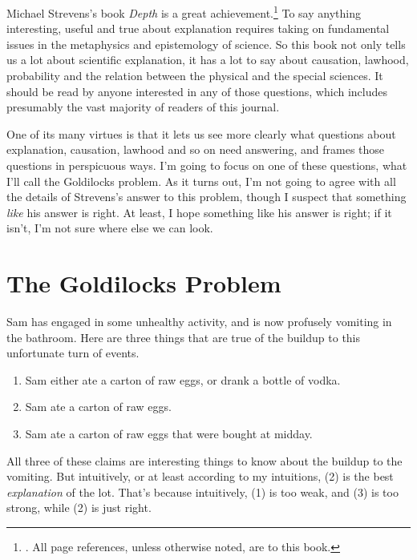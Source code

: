Michael Strevens's book \textit{Depth} is a great achievement.\footnote{\citet{Strevens2008}. All page references, unless otherwise noted, are to this book.} To say anything interesting, useful and true about explanation requires taking on fundamental issues in the metaphysics and epistemology of science. So this book not only tells us a lot about scientific explanation, it has a lot to say about causation, lawhood, probability and the relation between the physical and the special sciences. It should be read by anyone interested in any of those questions, which includes presumably the vast majority of readers of this journal.

One of its many virtues is that it lets us see more clearly what questions about explanation, causation, lawhood and so on need answering, and frames those questions in perspicuous ways. I'm going to focus on one of these questions, what I'll call the Goldilocks problem. As it turns out, I'm not going to agree with all the details of Strevens's answer to this problem, though I suspect that something \textit{like} his answer is right. At least, I hope something like his answer is right; if it isn't, I'm not sure where else we can look.


\section{The Goldilocks Problem}

Sam has engaged in some unhealthy activity, and is now profusely vomiting in the bathroom. Here are three things that are true of the buildup to this unfortunate turn of events.

\begin{enumerate}
\renewcommand{\labelenumi}{(\arabic{enumi})}
\item Sam either ate a carton of raw eggs, or drank a bottle of vodka.
\item Sam ate a carton of raw eggs.
\item Sam ate a carton of raw eggs that were bought at midday.
\end{enumerate}

\noindent All three of these claims are interesting things to know about the buildup to the vomiting. But intuitively, or at least according to my intuitions, (2) is the best \textit{explanation} of the lot. That's because intuitively, (1) is too weak, and (3) is too strong, while (2) is just right.

